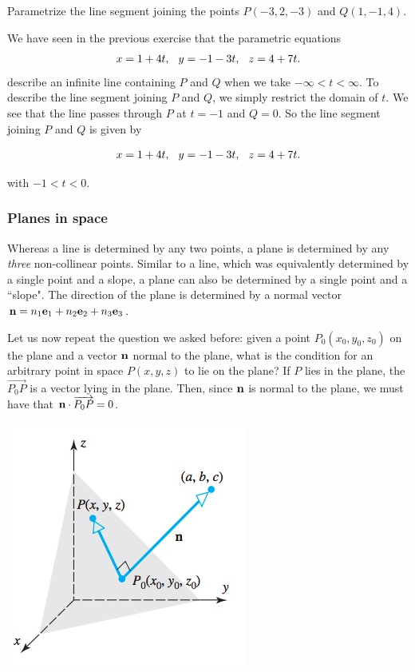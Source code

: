 \documentclass[12pt,letterpaper,reqno]{article}
\numberwithin{equation}{section}
\newcommand{\ti}[1]{\textit{#1}}
\newcommand{\fixme}[1]{{\color{orange}{[#1]}}}
\begin{document}
\begin{exercise}
Parametrize the line segment joining the points $P(-3,2,-3)$ and $Q(1,-1,4)$.	
\end{exercise}
{\color{red} 
We have seen in the previous exercise that the  parametric equations 
\begin{align*}
	x=1+4t, \hspace{0.25cm} y=-1-3t, \hspace{0.25cm} z=4+7t.
\end{align*}
describe an infinite line containing $P$ and $Q$ when we take $-\infty < t < \infty$. To describe the line segment joining $P$ and $Q$, we simply restrict the domain of $t$. We see that the line passes through $P$ at $t=-1$ and $Q=0$. So the line segment joining $P$ and $Q$ is given by 

\begin{align*}
	x=1+4t, \hspace{0.25cm} y=-1-3t, \hspace{0.25cm} z=4+7t.
\end{align*}

with $-1 < t < 0$.}

\subsubsection{Planes in space}
\fixme{Include the simplified distance formulas from Anton section 3.3 (starting on page 148).}
Whereas a line is determined by any two points, a plane is determined by any \ti{three} non-collinear points. Similar to a line, which was equivalently determined by a single point and a slope, a plane can also be determined by a single point and a ``slope". The direction of the plane is determined by a normal vector ${\bf n}=n_1{\bf e}_1+n_2{\bf e}_2+n_3{\bf e}_3$. 

Let us now repeat the question we asked before: given a point $P_0(x_0,y_0,z_0)$ on the plane and a vector ${\bf n}$ normal to the plane, what is the condition for an arbitrary point in space $P(x,y,z)$ to lie on the plane? If $P$ lies in the plane, the $\overrightarrow{P_0P}$ is a vector lying in the plane. Then, since ${\bf n}$ is normal to the plane, we must have that ${\bf n} \cdot \overrightarrow{P_0P}=0$.

\begin{center}
	\includegraphics[scale=0.5]{figures_mvc/vector_equation_of_a_plane}
\end{center}
\end{document}

